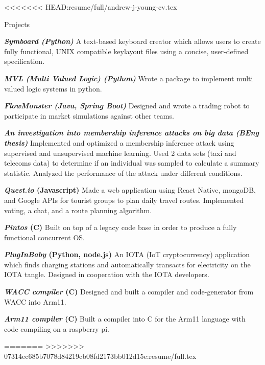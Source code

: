 \documentclass[10pt]{resume} %
\begin{document}
<<<<<<< HEAD:resume/full/andrew-j-young-cv.tex
\begin{rSection}{Projects}

  \item \textbf{\textit{Symboard (Python)}} A text-based keyboard creator which
    allows users to create fully functional, UNIX compatible keylayout files
    using a concise, user-defined specification.
  \item \textbf{\textit{MVL (Multi Valued Logic) (Python)}} Wrote a package to
    implement multi valued logic systems in python.
  \item \textbf{\textit{FlowMonster (Java, Spring Boot)}} Designed and wrote a
    trading robot to participate in market simulations against other teams.
  \item \textbf{\textit{An investigation into membership inference attacks on
    big data (BEng thesis)}} Implemented and optimized a membership inference
    attack using supervised and unsupervised machine learning. Used 2 data sets
    (taxi and telecoms data) to determine if an individual was sampled to
    calculate a summary statistic. Analyzed the performance of the attack
    under different conditions.
  \item \textbf{\textit{Quest.io} (Javascript)} Made a web application using
    React Native, mongoDB, and Google APIs for tourist groups to plan daily
    travel routes. Implemented voting, a chat, and a route planning algorithm.
  \item \textbf{\textit{Pintos} (C)} Built on top of a legacy code base in
    order to produce a fully functional concurrent OS.
  \item \textbf{\textit{PlugInBaby} (Python, node.js)} An IOTA (IoT
    cryptocurrency) application which finds charging stations and
    automatically transacts for electricity on the IOTA tangle. Designed in
    cooperation with the IOTA developers.
  \item \textbf{\textit{WACC compiler} (C)} Designed and built a compiler and
    code-generator from WACC into Arm11.
  \item \textbf{\textit{Arm11 compiler} (C)} Built a compiler into C for the
    Arm11 language with code compiling on a raspberry pi.

\end{rSection}

=======
>>>>>>> 07314ec685b7078d84219cb08fd2173bb012d15e:resume/full.tex
\end{document}
